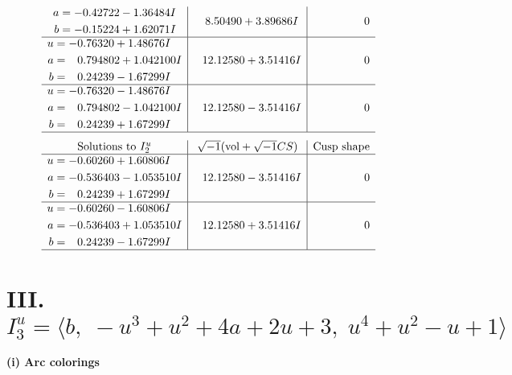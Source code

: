 \documentclass[1p]{elsarticle_modified}
\theoremstyle{definition}
\newcommand{\I}{\sqrt{-1}}
\begin{document}
$$\begin{array}{c|c|c}
\begin{aligned}
a &= -0.42722 - 1.36484 I \\
b &= -0.15224 + 1.62071 I\end{aligned}
 & \phantom{-}8.50490 + 3.89686 I & \phantom{-0.000000 } 0 \\ \hline\begin{aligned}
u &= -0.76320 + 1.48676 I \\
a &= \phantom{-}0.794802 + 1.042100 I \\
b &= \phantom{-}0.24239 - 1.67299 I\end{aligned}
 & \phantom{-}12.12580 + 3.51416 I & \phantom{-0.000000 } 0 \\ \hline\begin{aligned}
u &= -0.76320 - 1.48676 I \\
a &= \phantom{-}0.794802 - 1.042100 I \\
b &= \phantom{-}0.24239 + 1.67299 I\end{aligned}
 & \phantom{-}12.12580 - 3.51416 I & \phantom{-0.000000 } 0\\
 \hline 
 \end{array}$$\newpage$$\begin{array}{c|c|c}  
\text{Solutions to }I^u_{2}& \I (\text{vol} + \sqrt{-1}CS) & \text{Cusp shape}\\
 \hline 
\begin{aligned}
u &= -0.60260 + 1.60806 I \\
a &= -0.536403 - 1.053510 I \\
b &= \phantom{-}0.24239 + 1.67299 I\end{aligned}
 & \phantom{-}12.12580 - 3.51416 I & \phantom{-0.000000 } 0 \\ \hline\begin{aligned}
u &= -0.60260 - 1.60806 I \\
a &= -0.536403 + 1.053510 I \\
b &= \phantom{-}0.24239 - 1.67299 I\end{aligned}
 & \phantom{-}12.12580 + 3.51416 I & \phantom{-0.000000 } 0\\
 \hline 
 \end{array}$$\newpage\newpage\renewcommand{\arraystretch}{1}
\centering \section*{III. $I^u_{3}= \langle b,\;- u^3+u^2+4 a+2 u+3,\;u^4+u^2- u+1 \rangle$}
\flushleft \textbf{(i) Arc colorings}\\
\end{document}
